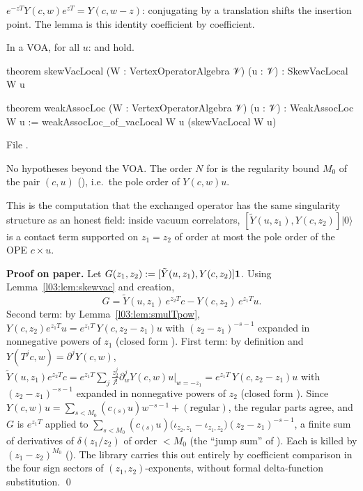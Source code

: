 \begin{physics}
$e^{-zT}Y(c,w)e^{zT} = Y(c,w-z)$: conjugating by a translation shifts the insertion point. The lemma
is this identity coefficient by coefficient.
\end{physics}

\begin{theorem}\label{l03:thm:skewvac}
In a VOA, for all $u$:  and  hold.
\end{theorem}
\begin{leancode}
theorem skewVacLocal (W : VertexOperatorAlgebra 𝒱) (u : 𝒱) : SkewVacLocal W u

theorem weakAssocLoc (W : VertexOperatorAlgebra 𝒱) (u : 𝒱) : WeakAssocLoc W u :=
  weakAssocLoc_of_vacLocal W u (skewVacLocal W u)
\end{leancode}
File .

\begin{dictionary}
No hypotheses beyond the VOA. The order $N$ for  is the regularity bound $M_0$ of
the pair $(c,u)$ (), i.e.\ the pole order of $Y(c,w)u$.
\end{dictionary}

\begin{physics}
This is the computation that the exchanged operator has the same singularity structure as an honest
field: inside vacuum correlators, $[\tilde Y(u,z_1),Y(c,z_2)]|0\rangle$ is a contact term supported on
$z_1 = z_2$ of order at most the pole order of the OPE $c\times u$.
\end{physics}

\textbf{Proof on paper.} Let $G(z_1,z_2) := [\tilde Y(u,z_1),Y(c,z_2)]\mathbf{1}$. Using
Lemma~\ref{l03:lem:skewvac} and creation,
\begin{equation*}
G = \tilde Y(u,z_1)\,e^{z_2T}c - Y(c,z_2)\,e^{z_1T}u .
\end{equation*}
Second term: by Lemma~\ref{l03:lem:smulTpow}, $Y(c,z_2)e^{z_1T}u = e^{z_1T}\,Y(c,z_2-z_1)u$ with
$(z_2-z_1)^{-s-1}$ expanded in nonnegative powers of $z_1$ (closed form ). First
term: by definition and $Y(T^jc,w) = \partial^jY(c,w)$,
$\tilde Y(u,z_1)e^{z_2T}c = e^{z_1T}\sum_j\frac{z_2^j}{j!}\partial^j_{w}Y(c,w)u\big|_{w=-z_1} =
e^{z_1T}\,Y(c,z_2-z_1)u$ with $(z_2-z_1)^{-s-1}$ expanded in nonnegative powers of $z_2$ (closed form
). Since $Y(c,w)u = \sum_{s<M_0}(c_{(s)}u)w^{-s-1} + (\text{regular})$, the
regular parts agree, and $G$ is $e^{z_1T}$ applied to $\sum_{s<M_0}(c_{(s)}u)\big(\iota_{z_2,z_1} -
\iota_{z_1,z_2}\big)(z_2-z_1)^{-s-1}$, a finite sum of derivatives of $\delta(z_1/z_2)$ of order $<M_0$
(the ``jump sum'' of ). Each is killed by $(z_1-z_2)^{M_0}$
(). The library carries this out entirely by coefficient
comparison in the four sign sectors of $(z_1,z_2)$-exponents, without formal delta-function
substitution. \qed

